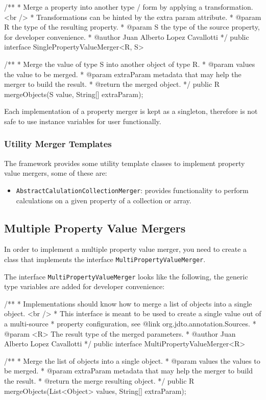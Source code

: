 \documentclass[11pt]{article}
\begin{document}
\begin{java}

/**
 * Merge a property into another type / form by applying a transformation. <br />
 * Transformations can be hinted by the extra param attribute.
 * @param R the type of the resulting property.
 * @param S the type of the source property, for developer convenience.
 * @author Juan Alberto Lopez Cavallotti
 */
public interface SinglePropertyValueMerger<R, S> {

    /**
     * Merge the value of type S into another object of type R.
     * @param values the value to be merged.
     * @param extraParam metadata that may help the merger to build the result.
     * @return the merged object.
     */
    public R mergeObjects(S value, String[] extraParam);
}

\end{java}

Each implementation of a property merger is kept as a singleton, therefore is not safe to use instance variables for user functionally.

\subsubsection{Utility Merger Templates}

The framework provides some utility template classes to implement property value mergers, some of these are:

\begin{itemize}
\item \texttt{AbstractCalulationCollectionMerger}: provides functionality to perform calculations on a given property of a collection or array.
\end{itemize}


\subsection{Multiple Property Value Mergers}

In order to implement a multiple property value merger, you need to create a class that implements the interface \texttt{MultiPropertyValueMerger}.

The interface \texttt{MultiPropertyValueMerger} looks like the following, the generic type variables are added for developer convenience:

\begin{java}
/**
 * Implementations should know how to merge a list of objects into a single object. <br />
 * This interface is meant to be used to create a single value out of a multi-source
 * property configuration, see {@link org.jdto.annotation.Sources}.
 * @param <R> The result type of the merged parameters.
 * @author Juan Alberto Lopez Cavallotti
 */
public interface MultiPropertyValueMerger<R> {
    
    /**
     * Merge the list of objects into a single object.
     * @param values the values to be merged.
     * @param extraParam metadata that may help the merger to build the result.
     * @return the merge resulting object.
     */
    public R mergeObjects(List<Object> values, String[] extraParam);
}
\end{java}
\end{document}
